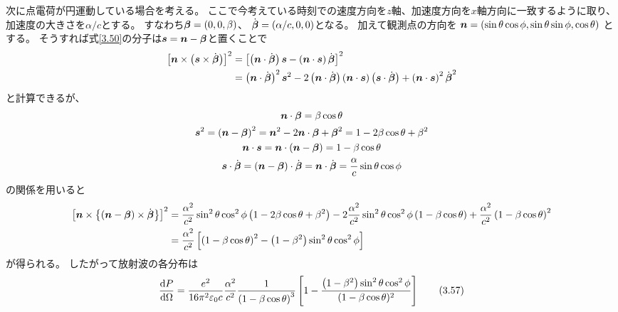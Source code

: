 \documentclass[a4paper, 10pt]{jsarticle}
\theoremstyle{definition}
\def\vec#1{\mbox{\boldmath $#1$}}
\newcommand{\dif}[2]{\frac{{\rm d} #1}{{\rm d} #2}}
\begin{document}
次に点電荷が円運動している場合を考える。
ここで今考えている時刻での速度方向を$z$軸、加速度方向を$x$軸方向に一致するように取り、
加速度の大きさを$\alpha/c$とする。
すなわち$\vec{\beta} = (0, 0, \beta)$、
$\dot{\vec{\beta}} = (\alpha/c, 0, 0)$となる。
加えて観測点の方向を
$\vec{n} = (\sin \theta \cos \phi, \sin \theta \sin \phi, \cos \theta)$
とする。
そうすれば式\eqref{3.50}の分子は$\vec{s} = \vec{n} - \vec{\beta}$と置くことで
\begin{align}
	\left[ 
		\vec{n} \times \left( \vec{s} \times \dot{\vec{\beta}} \right)
	\right]^2
	&= \left[ \left( \vec{n} \cdot \dot{\vec{\beta}} \right) \vec{s}
	- \left( \vec{n} \cdot \vec{s} \right) \dot{\vec{\beta}} \right]^2 \\
	&= \left( \vec{n} \cdot \dot{\vec{\beta}} \right)^2 \vec{s}^2
	- 2 \left( \vec{n} \cdot \dot{\vec{\beta}} \right)
	\left( \vec{n} \cdot \vec{s} \right)
	\left( \vec{s} \cdot \dot{\vec{\beta}} \right)
	+ \left( \vec{n} \cdot \vec{s} \right)^2 \dot{\vec{\beta}}^2
\end{align}
と計算できるが、
\begin{gather}
	\vec{n} \cdot \vec{\beta} = \beta \cos \theta \\
	\vec{s}^2 = \left( \vec{n} - \vec{\beta} \right)^2
	= \vec{n}^2 - 2\vec{n} \cdot \vec{\beta} + \vec{\beta}^2
	= 1 - 2\beta \cos \theta + \beta^2 \\
	\vec{n} \cdot \vec{s} = \vec{n} \cdot \left( \vec{n} - \vec{\beta} \right)
	= 1 - \beta \cos \theta \\
	\vec{s} \cdot \dot{\vec{\beta}}
	= \left( \vec{n} - \vec{\beta} \right) \cdot \dot{\vec{\beta}}
	= \vec{n} \cdot \dot{\vec{\beta}}
	= \frac{\alpha}{c} \sin \theta \cos \phi
\end{gather}
の関係を用いると
\begin{align}
	\left[ \vec{n} \times \left\{
		\left(\vec{n} - \vec{\beta}\right) \times \dot{\vec{\beta}} 
	\right\} \right]^2
	&= \frac{\alpha^2}{c^2} \sin^2 \theta \cos^2 \phi
	\left( 1 - 2\beta \cos \theta + \beta^2 \right)
	- 2 \frac{\alpha^2}{c^2} \sin^2 \theta \cos^2 \phi
	\left( 1 - \beta \cos \theta \right)
	+ \frac{\alpha^2}{c^2} \left( 1 - \beta \cos \theta \right)^2 \\
	&= \frac{\alpha^2}{c^2} \left[
		\left( 1 - \beta \cos \theta \right)^2
		- \left( 1 - \beta^2 \right) \sin^2 \theta \cos^2 \phi
	\right]
\end{align}
が得られる。
したがって放射波の各分布は
\begin{align}
	\dif{P}{\Omega} = \frac{e^2}{16 \pi^2 \varepsilon_0 c} \frac{\alpha^2}{c^2}
	\frac{1}{\left( 1 - \beta \cos \theta \right)^3} \left[
		1 - \frac{\left( 1 - \beta^2 \right) \sin^2 \theta \cos^2 \phi}
		{(1 - \beta \cos \theta)^2}
	\right]
	\tag{3.57} \label{3.57}
\end{align}
\end{document}
